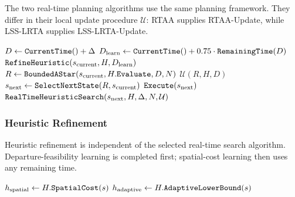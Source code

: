 \documentclass[11pt]{article}
\begin{document}
The two real-time planning algorithms use the same planning framework. They differ in their local update procedure \(\mathcal{U}\): RTAA supplies \textsf{RTAA-Update}, while
LSS-LRTA supplies \textsf{LSS-LRTA-Update}.

\begin{algorithm}[H]
  \caption{Real-time heuristic search planning}
  \label{alg:real-time-heuristic-search}
  \(D \gets \FuncSty{CurrentTime}() + \Delta\)\;
  \(D_{\mathrm{learn}} \gets \FuncSty{CurrentTime}()
  + 0.75 \cdot \FuncSty{RemainingTime}(D)\)\;
  \(\FuncSty{RefineHeuristic}(s_{\mathrm{current}},H,D_{\mathrm{learn}})\)\;
  \(R \gets
  \FuncSty{BoundedAStar}(s_{\mathrm{current}},H.\FuncSty{Evaluate},D,N)\)\;
  \(\mathcal{U}(R,H,D)\)\;
  \(s_{\mathrm{next}} \gets
  \FuncSty{SelectNextState}(R,s_{\mathrm{current}})\)\;
  \(\FuncSty{Execute}(s_{\mathrm{next}})\)\;
  \(\FuncSty{RealTimeHeuristicSearch}(
    s_{\mathrm{next}},H,\Delta,N,\mathcal{U})\)\;
\end{algorithm}

\subsubsection{Heuristic Refinement}

Heuristic refinement is independent of the selected real-time search algorithm.
Departure-feasibility learning is completed first; spatial-cost learning then
uses any remaining time.

\begin{algorithm}[H]
  \caption{Incremental heuristic refinement}
  \label{alg:refine-heuristic}
\end{algorithm}

\begin{algorithm}[H]
  \caption{Heuristic evaluation}
  \label{alg:evaluate-heuristic}
  \(h_{\mathrm{spatial}} \gets H.\FuncSty{SpatialCost}(s)\)\;
  \(h_{\mathrm{adaptive}} \gets H.\FuncSty{AdaptiveLowerBound}(s)\)\;
  \;
\end{algorithm}
\end{document}
